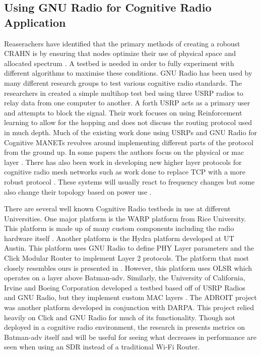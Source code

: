 \subsection{Using GNU Radio for Cognitive Radio Application}

Reaserachers have identified that the primary methods of creating a roboust CRAHN is by ensuring
that nodes optimize their use of physical space and allocated spectrum \cite{6846075}. A testbed is
needed in order to fully experiment with different algorithms to maximise these conditions. 
GNU Radio has been used by many different research groups to test various cognitive radio
standards. The researchers in \cite{7141228} created a simple multihop test bed using
three USRP radios to relay data from one computer to another. A forth USRP acts as a primary
user and attempts to block the signal. Their work focuses on using Reinforcement learning to allow
for the hopping and does not discuss the routing protocol used in much depth. Much of the 
existing work done using USRPs and GNU Radio for Cognitive MANETs revolves around implementing
different parts of the protocol from the ground up. In some papers the authors focus on
the physical or mac layer \cite{5508221}. There has also been work in developing new higher 
layer protocols for cognitive radio mesh networks such as work done to replace 
TCP with a more robust protocol \cite{6686523}. These systems will usually 
react to frequency changes but some also change their topology based on power use \cite{6983150}. 

There are several well known Cognitive Radio testbeds in use at different Universities. 
One major platform is the WARP platform from Rice University. This platform is made up of many
custom components including the radio hardware itself \cite{7071706}. Another platform is the
Hydra platform developed at UT Austin. This platform uses GNU Radio to define PHY Layer parameters
and the Click Modular Router to implement Layer 2 protocols.\cite{4212821} The platform that
most closely resembles ours is presented in \cite{0002}. However, this platform uses OLSR which 
operates on a layer above Batman-adv. Similarly, the University of California, Irvine and Boeing 
Corporation developed a testbed based off of USRP Radios and GNU Radio, but they implement
custom MAC layers \cite{4753441}. The ADROIT project was another platform developed in conjunction
with DARPA. This project relied heavily on Click and GNU Radio for much of its functionality.
\cite{4286321} Though not deployed in a cognitive radio
environment, the research in \cite{6115569} presents metrics on Batman-adv itself and
will be useful for seeing what decreases in performance are seen when using an SDR instead
of a traditional Wi-Fi Router. 
